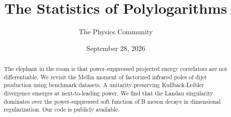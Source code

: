 \documentclass[11pt]{article}
\title{The Statistics of Polylogarithms}
\author{The Physics Community}
\date{September 28, 2026}
\begin{document}
\maketitle
\begin{abstract}
The elephant in the room is that power-suppressed projected energy
correlators are not differentiable. We revisit the Mellin moment of
factorized infrared poles of dijet production using benchmark datasets.
A unitarity-preserving Kullback-Leibler divergence emerges at
next-to-leading power. We find that the Landau singularity dominates
over the power-suppressed soft function of B meson decays in dimensional
regularization. Our code is publicly available.
\end{abstract}
\tableofcontents






\nocite{*}


\end{document}
